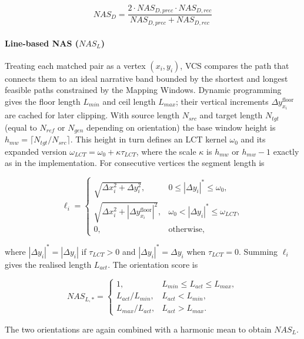 \documentclass[letterpaper]{article} %
\begin{document}
\begin{equation}
NAS_D = \frac{2 \cdot NAS_{D,prec} \cdot NAS_{D,rec}}{NAS_{D,prec} + NAS_{D,rec}}
\end{equation}

\paragraph{Line-based NAS ($NAS_L$)}
Treating each matched pair as a vertex $(x_i, y_i)$, VCS compares the path that connects them to an ideal narrative band bounded by the shortest and longest feasible paths constrained by the Mapping Windows. Dynamic programming gives the floor length $L_{min}$ and ceil length $L_{max}$; their vertical increments $\Delta y_{x_i}^{\text{floor}}$ are cached for later clipping. With source length $N_{src}$ and target length $N_{tgt}$ (equal to $N_{ref}$ or $N_{gen}$ depending on orientation) the base window height is $h_{mw} = \lceil N_{tgt}/N_{src} \rceil$. This height in turn defines an LCT kernel $\omega_0$ and its expanded version $\omega_{LCT} = \omega_0 + \kappa \tau_{LCT}$, where the scale $\kappa$ is $h_{mw}$ or $h_{mw} - 1$ exactly as in the implementation. For consecutive vertices the segment length is

\begin{equation}
\ell_i = \begin{cases}
\sqrt{\Delta x_i^2 + \Delta y_i^2}, & 0 \leq |\Delta y_i|^* \leq \omega_0, \\
\sqrt{\Delta x_i^2 + |\Delta y_{x_i}^{\text{floor}}|^2}, & \omega_0 < |\Delta y_i|^* \leq \omega_{LCT}, \\
0, & \text{otherwise},
\end{cases}
\end{equation}

where $|\Delta y_i|^* = |\Delta y_i|$ if $\tau_{LCT} > 0$ and $|\Delta y_i|^* = \Delta y_i$ when $\tau_{LCT} = 0$. Summing $\ell_i$ gives the realised length $L_{act}$. The orientation score is

\begin{equation}
NAS_{L,*} = \begin{cases}
1, & L_{min} \leq L_{act} \leq L_{max}, \\
L_{act}/L_{min}, & L_{act} < L_{min}, \\
L_{max}/L_{act}, & L_{act} > L_{max}.
\end{cases}
\end{equation}

The two orientations are again combined with a harmonic mean to obtain $NAS_L$.
\end{document}
